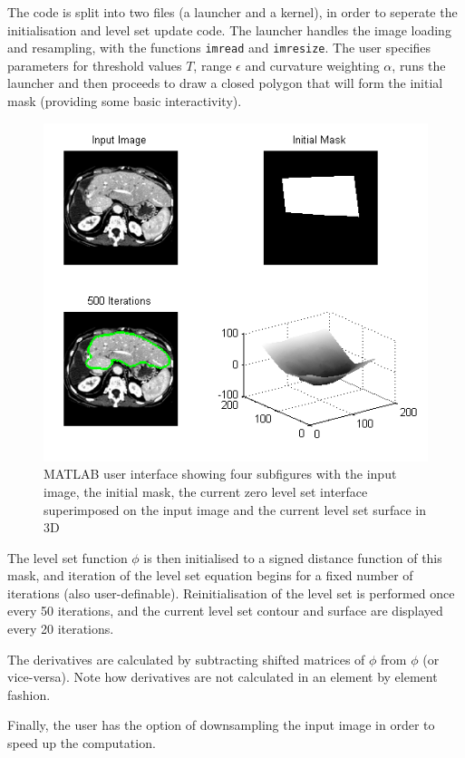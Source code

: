 The code is split into two files (a launcher and a kernel), in order to seperate the initialisation and level set update code. The launcher handles the image loading and resampling, with the functions \texttt{imread} and \texttt{imresize}. The user specifies parameters for threshold values $T$, range $\epsilon$ and curvature weighting $\alpha$, runs the launcher and then proceeds to draw a closed polygon that will form the initial mask (providing some basic interactivity). 

\begin{figure}[h]
	\centering
		\includegraphics[scale=0.6]{images/matlab.png}
	\caption{MATLAB user interface showing four subfigures with the input image, the initial mask, the current zero level set interface superimposed on the input image and the current level set surface in 3D}
	\label{fig:matlab}
\end{figure}

The level set function $\phi$ is then initialised to a signed distance function of this mask, and iteration of the level set equation begins for a fixed number of iterations (also user-definable). Reinitialisation of the level set is performed once every 50 iterations, and the current level set contour and surface are displayed every 20 iterations.

The derivatives are calculated by subtracting shifted matrices of $\phi$ from $\phi$ (or vice-versa). Note how derivatives are not calculated in an element by element fashion.

Finally, the user has the option of downsampling the input image in order to speed up the computation.


